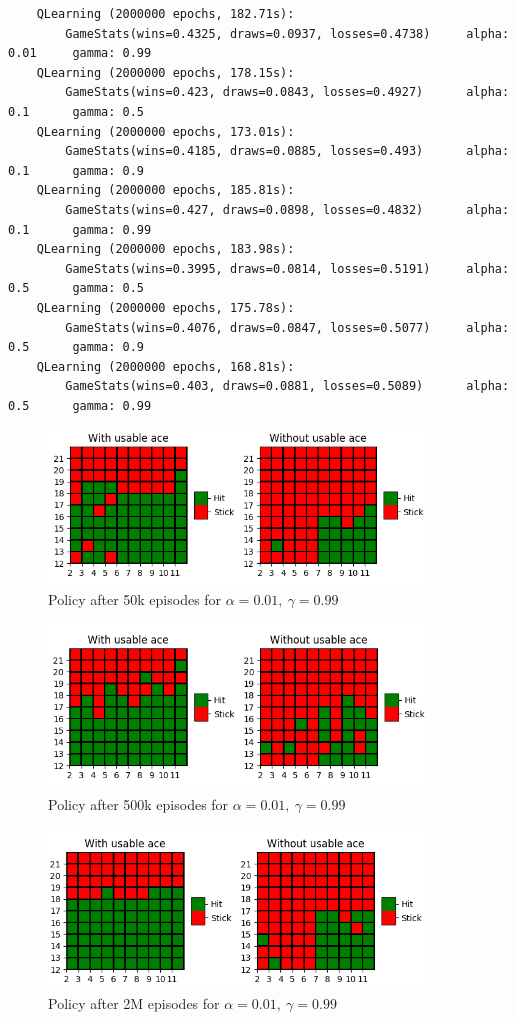 \documentclass{article}
\begin{document}
\begin{verbatim}
    QLearning (2000000 epochs, 182.71s):
        GameStats(wins=0.4325, draws=0.0937, losses=0.4738)		alpha: 0.01		gamma: 0.99
    QLearning (2000000 epochs, 178.15s):
        GameStats(wins=0.423, draws=0.0843, losses=0.4927)		alpha: 0.1		gamma: 0.5
    QLearning (2000000 epochs, 173.01s):
        GameStats(wins=0.4185, draws=0.0885, losses=0.493)		alpha: 0.1		gamma: 0.9
    QLearning (2000000 epochs, 185.81s):
        GameStats(wins=0.427, draws=0.0898, losses=0.4832)		alpha: 0.1		gamma: 0.99
    QLearning (2000000 epochs, 183.98s):
        GameStats(wins=0.3995, draws=0.0814, losses=0.5191)		alpha: 0.5		gamma: 0.5
    QLearning (2000000 epochs, 175.78s):
        GameStats(wins=0.4076, draws=0.0847, losses=0.5077)		alpha: 0.5		gamma: 0.9
    QLearning (2000000 epochs, 168.81s):
        GameStats(wins=0.403, draws=0.0881, losses=0.5089)		alpha: 0.5		gamma: 0.99
\end{verbatim}

\begin{figure}[h]
    \centering
    \includegraphics[width=10cm]{plots/ql_policy_50k.png}
    \caption{Policy after 50k episodes for $\alpha=0.01,\ \gamma=0.99$}
\end{figure}

\begin{figure}[h]
    \centering
    \includegraphics[width=10cm]{plots/ql_policy_500k.png}
    \caption{Policy after 500k episodes for $\alpha=0.01,\ \gamma=0.99$}
\end{figure}

\begin{figure}[h]
    \centering
    \includegraphics[width=10cm]{plots/ql_policy_2M.png}
    \caption{Policy after 2M episodes for $\alpha=0.01,\ \gamma=0.99$}
\end{figure}
\end{document}
